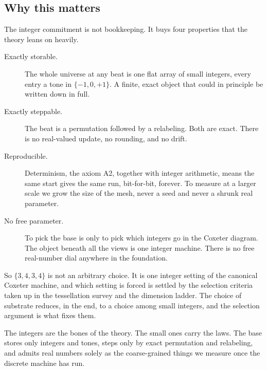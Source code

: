 \subsection{Why this matters}

The integer commitment is not bookkeeping. It buys four properties that the theory leans on heavily.

\begin{description}
\item[Exactly storable.] The whole universe at any beat is one flat array of small integers, every entry a tone in $\{-1, 0, +1\}$. A finite, exact object that could in principle be written down in full.
\item[Exactly steppable.] The beat is a permutation followed by a relabeling. Both are exact. There is no real-valued update, no rounding, and no drift.
\item[Reproducible.] Determinism, the axiom A2, together with integer arithmetic, means the same start gives the same run, bit-for-bit, forever. To measure at a larger scale we grow the size of the mesh, never a seed and never a shrunk real parameter.
\item[No free parameter.] To pick the base is only to pick which integers go in the Coxeter diagram. The object beneath all the views is one integer machine. There is no free real-number dial anywhere in the foundation.
\end{description}

So $\{3,4,3,4\}$ is not an arbitrary choice. It is one integer setting of the canonical Coxeter machine, and which setting is forced is settled by the selection criteria taken up in the tessellation survey and the dimension ladder. The choice of substrate reduces, in the end, to a choice among small integers, and the selection argument is what fixes them.

\begin{principle}
The integers are the bones of the theory. The small ones carry the laws. The base stores only integers and tones, steps only by exact permutation and relabeling, and admits real numbers solely as the coarse-grained things we measure once the discrete machine has run.
\end{principle}

